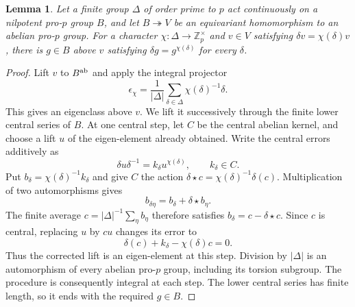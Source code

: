 \documentclass[11pt]{article}
\newtheorem{lemma}[theorem]{Lemma}
\theoremstyle{definition}\newtheorem{definition}[theorem]{Definition}
\begin{document}
\begin{lemma}\label{lem:tame-eigen-element-lift}
Let a finite group \(\Delta\) of order prime to \(p\) act
continuously on a nilpotent pro-\(p\) group \(B\), and let
\(B\twoheadrightarrow V\) be an equivariant homomorphism to
an abelian pro-\(p\) group. For a character
\(\chi:\Delta\to\mathbb Z_p^\times\) and
\(v\in V\) satisfying \(\delta v=\chi(\delta)v\),
there is \(g\in B\) above \(v\) satisfying
\(\delta g=g^{\chi(\delta)}\) for every \(\delta\).
\end{lemma}
\begin{proof}
Lift \(v\) to \(B^{\rm ab}\) and apply the integral projector
\[
 \epsilon_\chi=\frac1{|\Delta|}
               \sum_{\delta\in\Delta}\chi(\delta)^{-1}\delta.
\]
This gives an eigenclass above \(v\). We lift it successively
through the finite lower central series of \(B\).
At one central step, let \(C\) be the central abelian kernel,
and choose a lift \(u\) of the eigen-element already obtained.
Write the central errors additively as
\[
 \delta u\delta^{-1}=k_\delta u^{\chi(\delta)},
 \qquad k_\delta\in C.
\]
Put \(b_\delta=\chi(\delta)^{-1}k_\delta\) and give \(C\)
the action \(\delta\star c=\chi(\delta)^{-1}\delta(c)\).
Multiplication of two automorphisms gives
\[
 b_{\delta\eta}=b_\delta+\delta\star b_\eta.
\]
The finite average \(c=|\Delta|^{-1}\sum_\eta b_\eta\)
therefore satisfies \(b_\delta=c-\delta\star c\).
Since \(c\) is central, replacing \(u\) by \(cu\) changes
its error to
\[
 \delta(c)+k_\delta-\chi(\delta)c=0.
\]
Thus the corrected lift is an eigen-element at this step.
Division by \(|\Delta|\) is an automorphism of every abelian
pro-\(p\) group, including its torsion subgroup. The procedure
is consequently integral at each step. The lower central
series has finite length, so it ends with the required
\(g\in B\).
\end{proof}
\end{document}
